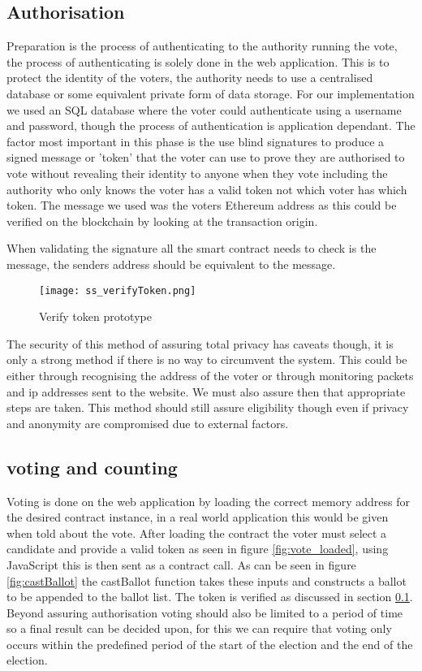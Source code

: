 \documentclass{entcs}
\begin{document}
\subsection{Authorisation}\label{sec: Auth}
Preparation is the process of authenticating to the authority running the vote, the process of authenticating is solely done in the web application. This is to protect the identity of the voters, the authority needs to use a centralised database or some equivalent private form of data storage. For our implementation we used an SQL database where the voter could authenticate using a username and password, though the process of authentication is application dependant. The factor most important in this phase is the use blind signatures to produce a signed message or 'token' that the voter can use to prove they are authorised to vote without revealing their identity to anyone when they vote including the authority who only knows the voter has a valid token not which voter has which token. The message we used was the voters Ethereum address as this could be verified on the blockchain by looking at the transaction origin.

When validating the signature all the smart contract needs to check is the message, the senders address should be equivalent to the message.

\begin{figure}[h!]
    \centering
    \texttt{[image: ss\_verifyToken.png]}
    \caption{Verify token prototype}
    \label{fig:verifyToken}
\end{figure}

The security of this method of assuring total privacy has caveats though, it is only a strong method if there is no way to circumvent the system. This could be either through recognising the address of the voter or through monitoring packets and ip addresses sent to the website. We must also assure then that appropriate steps are taken.
This method should still assure eligibility though even if privacy and anonymity are compromised due to external factors.

\subsection{voting and counting}
Voting is done on the web application by loading the correct memory address for the desired contract instance, in a real world application this would be given when told about the vote. After loading the contract the voter must select a candidate and provide a valid token as seen in figure \ref{fig:vote_loaded}, using JavaScript this is then sent as a contract call. As can be seen in figure \ref{fig:castBallot} the castBallot function takes these inputs and constructs a ballot to be appended to the ballot list. The token is verified as discussed in section \ref{sec: Auth}. 
Beyond assuring authorisation voting should also be limited to a period of time so a final result can be decided upon, for this we can require that voting only occurs within the predefined period of the start of the election and the end of the election.
\end{document}
